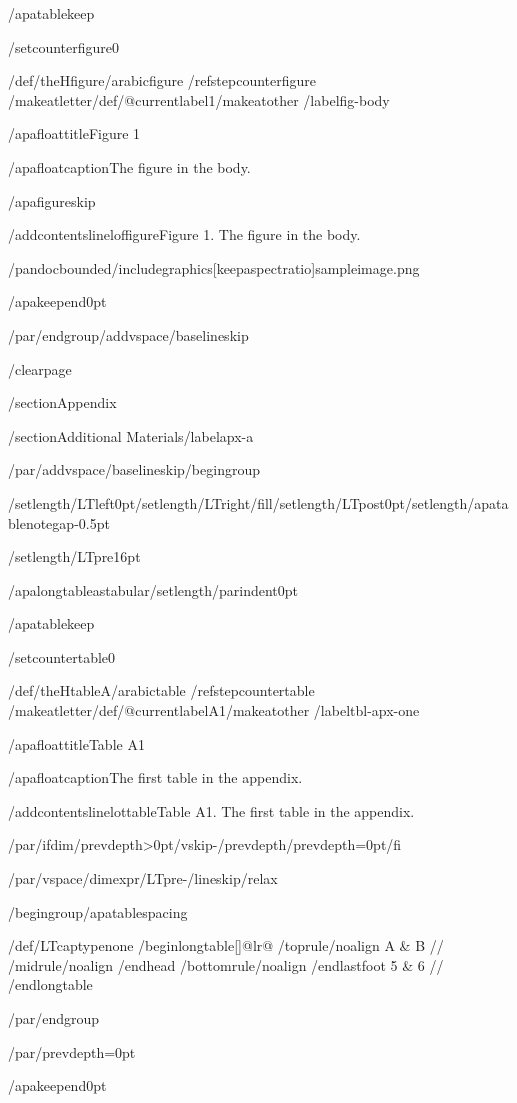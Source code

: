 /apatablekeep

/setcounter{figure}{0}

/def/theHfigure{/arabic{figure}}%
/refstepcounter{figure}%
/makeatletter/def/@currentlabel{1}/makeatother%
/label{fig-body}

/apafloattitle{Figure 1}

/apafloatcaption{The figure in the body.}

/apafigureskip

/addcontentsline{lof}{figure}{Figure 1. The figure in the body.}

/pandocbounded{/includegraphics[keepaspectratio]{sampleimage.png}}

/apakeepend{0pt}

/par/endgroup/addvspace{/baselineskip}

/clearpage

/section{Appendix}

/section{Additional Materials}/label{apx-a}

/par/addvspace{/baselineskip}/begingroup

/setlength{/LTleft}{0pt}/setlength{/LTright}{/fill}/setlength{/LTpost}{0pt}/setlength{/apatablenotegap}{-0.5pt}

/setlength{/LTpre}{16pt}

/apalongtableastabular/setlength{/parindent}{0pt}

/apatablekeep

/setcounter{table}{0}

/def/theHtable{A/arabic{table}}%
/refstepcounter{table}%
/makeatletter/def/@currentlabel{A1}/makeatother%
/label{tbl-apx-one}

/apafloattitle{Table A1}

/apafloatcaption{The first table in the appendix.}

/addcontentsline{lot}{table}{Table A1. The first table in the appendix.}

/par/ifdim/prevdepth>0pt/vskip-/prevdepth/prevdepth=0pt/fi

/par/vspace{/dimexpr/LTpre-/lineskip/relax}

/begingroup/apatablespacing

{/def/LTcaptype{none} %
/begin{longtable}[]{@{}lr@{}}
/toprule/noalign{}
A & B //
/midrule/noalign{}
/endhead
/bottomrule/noalign{}
/endlastfoot
5 & 6 //
/end{longtable}
}

/par/endgroup

/par/prevdepth=0pt

/apakeepend{0pt}

